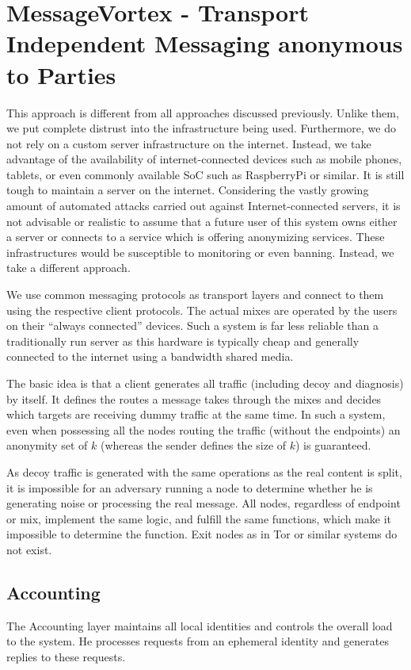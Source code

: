 \chapter{MessageVortex - Transport Independent Messaging anonymous to \texorpdfstring{}{3rd} Parties\label{sec:spec}}
This approach is different from all approaches discussed previously. Unlike them, we put complete distrust into the infrastructure being used. Furthermore, we do not rely on a custom server infrastructure on the internet. Instead, we take advantage of the availability of internet-connected devices such as mobile phones, tablets, or even commonly available SoC such as RaspberryPi or similar. It is still tough to maintain a server on the internet. Considering the vastly growing amount of automated attacks carried out against Internet-connected servers, it is not advisable or realistic to assume that a future user of this system owns either a server or connects to a service which is offering anonymizing services. These infrastructures would be susceptible to monitoring or even banning. Instead, we take a different approach.

We use common messaging protocols as transport layers and connect to them using the respective client protocols. The actual mixes are operated by the users on their ``always connected'' devices. Such a system is far less reliable than a traditionally run server as this hardware is typically cheap and generally connected to the internet using a bandwidth shared media.

The basic idea is that a client generates all traffic (including decoy and diagnosis) by itself. It defines the routes a message takes through the mixes and decides which targets are receiving dummy traffic at the same time. In such a system, even when possessing all the nodes routing the traffic (without the endpoints) an anonymity set of $k$ (whereas the sender defines the size of $k$) is guaranteed.

As decoy traffic is generated with the same operations as the real content is split, it is impossible for an adversary running a node to determine whether he is generating noise or processing the real message.
All nodes, regardless of endpoint or mix, implement the same logic, and fulfill the same functions, which make it impossible to determine the function. Exit nodes as in Tor or similar systems do not exist.

\section{Accounting}
The Accounting layer maintains all local identities and controls the overall load to the system. He processes requests from an ephemeral identity and generates replies to these requests. 

